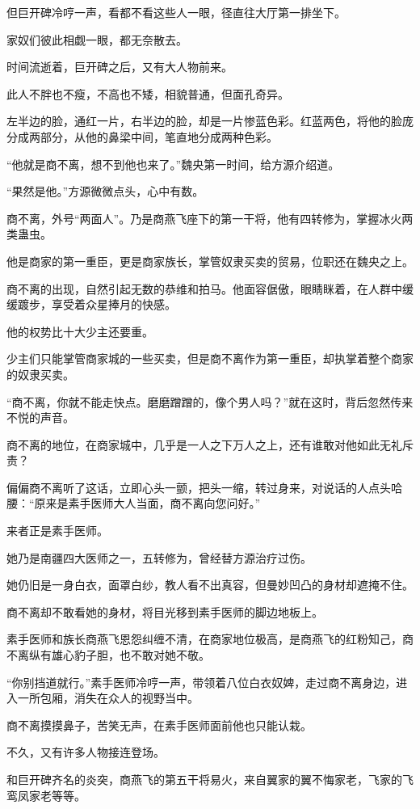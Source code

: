 \begin{this_body}
但巨开碑冷哼一声，看都不看这些人一眼，径直往大厅第一排坐下。

家奴们彼此相觑一眼，都无奈散去。

时间流逝着，巨开碑之后，又有大人物前来。

此人不胖也不瘦，不高也不矮，相貌普通，但面孔奇异。

左半边的脸，通红一片，右半边的脸，却是一片惨蓝色彩。红蓝两色，将他的脸庞分成两部分，从他的鼻梁中间，笔直地分成两种色彩。

“他就是商不离，想不到他也来了。”魏央第一时间，给方源介绍道。

“果然是他。”方源微微点头，心中有数。

商不离，外号“两面人”。乃是商燕飞座下的第一干将，他有四转修为，掌握冰火两类蛊虫。

他是商家的第一重臣，更是商家族长，掌管奴隶买卖的贸易，位职还在魏央之上。

商不离的出现，自然引起无数的恭维和拍马。他面容倨傲，眼睛眯着，在人群中缓缓踱步，享受着众星捧月的快感。

他的权势比十大少主还要重。

少主们只能掌管商家城的一些买卖，但是商不离作为第一重臣，却执掌着整个商家的奴隶买卖。

“商不离，你就不能走快点。磨磨蹭蹭的，像个男人吗？”就在这时，背后忽然传来不悦的声音。

商不离的地位，在商家城中，几乎是一人之下万人之上，还有谁敢对他如此无礼斥责？

偏偏商不离听了这话，立即心头一颤，把头一缩，转过身来，对说话的人点头哈腰：“原来是素手医师大人当面，商不离向您问好。”

来者正是素手医师。

她乃是南疆四大医师之一，五转修为，曾经替方源治疗过伤。

她仍旧是一身白衣，面罩白纱，教人看不出真容，但曼妙凹凸的身材却遮掩不住。

商不离却不敢看她的身材，将目光移到素手医师的脚边地板上。

素手医师和族长商燕飞恩怨纠缠不清，在商家地位极高，是商燕飞的红粉知己，商不离纵有雄心豹子胆，也不敢对她不敬。

“你别挡道就行。”素手医师冷哼一声，带领着八位白衣奴婢，走过商不离身边，进入一所包厢，消失在众人的视野当中。

商不离摸摸鼻子，苦笑无声，在素手医师面前他也只能认栽。

不久，又有许多人物接连登场。

和巨开碑齐名的炎突，商燕飞的第五干将易火，来自翼家的翼不悔家老，飞家的飞鸾凤家老等等。


\end{this_body}
